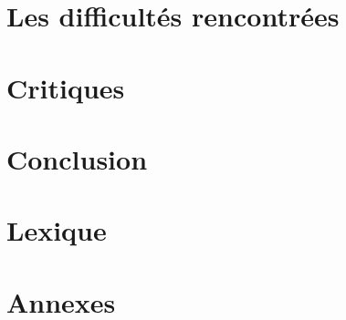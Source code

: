 \documentclass[12pt]{article}
\begin{document}
	\section{Les difficultés rencontrées}
	\section{Critiques}
	\section{Conclusion}

\section{Lexique}
\section{Annexes}


 
\end{document}
